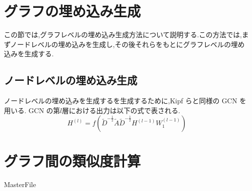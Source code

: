 \documentclass[a4j,twoside,12pt]{thesis} %
\begin{document}
\section{グラフの埋め込み生成}\label{meth:createEmbedding}
  この節では,グラフレベルの埋め込み生成方法について説明する.この方法では,まずノードレベルの埋め込みを生成し,その後それらをもとにグラフレベルの埋め込みを生成する.
  \subsection{ノードレベルの埋め込み生成}
  ノードレベルの埋め込みを生成するを生成するために,Kipf ら\cite{kipf2017semi}と同様の GCN を用いる.
  GCN の第$l$層における出力は以下の式で表される.
  \begin{equation}H^{(l)}=f(\tilde{D}^{-\frac{1}{2}}\tilde{A}\tilde{D}^{-\frac{1}{2}}H^{(l-1)}W_{1}^{(l-1)})\end{equation}

\section{グラフ間の類似度計算}\label{meth:calculateSimilarity}
\expandafter\ifx\csname MasterFile\endcsname\relax
\def\MasterFile{本原稿です}

%



\end{document}
